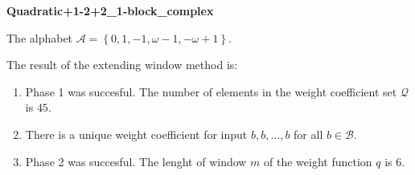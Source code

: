\begin{exmp}
\textbf{ Quadratic+1-2+2\_1-block\_complex }

\label{ex:Quadratic+1-2+21-blockcomplex}

The alphabet $\mathcal{A} =\left\{0, 1, -1, \omega - 1, -\omega + 1\right\}$.

The result of the extending window method is:
\begin{enumerate}
    \item Phase 1 was succesful.
The number of elements in the weight coefficient set $\mathcal{Q}$ is $45$.

    \item There is a unique weight coefficient for input $b,b,\dots,b$ for all $b\in\mathcal{B}$.

    \item Phase 2 was succesful.
The lenght of window $m$ of the weight function $q$ is 6.
\end{enumerate}
\end{exmp}

